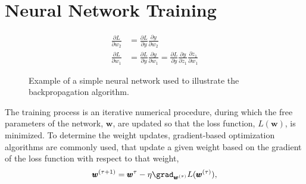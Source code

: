 \section{Neural Network Training}
\label{sec:nn-training}
\begin{figure}[t]
    \begin{align*}
        \frac{\partial L}{\partial w_2} &=  \frac{\partial L}{\partial y} \frac{\partial y}{\partial w_2} \\
        \frac{\partial L}{\partial w_1} &=  \frac{\partial L}{\partial y} \frac{\partial y}{\partial w_1} = \frac{\partial L}{\partial y} \frac{\partial y}{\partial z_1} \frac{\partial z_1}{\partial w_1}
    \end{align*}
    \caption{Example of a simple neural network used to illustrate the backpropagation algorithm.}
    \label{fig:simple-nn}
\end{figure}
The training process is an iterative numerical procedure, during which the free parameters of the network, $\pmb{w}$, are updated so that the loss function, $L(\pmb{w})$, is minimized. To determine the weight updates, gradient-based optimization algorithms are commonly used, that update a given weight based on the gradient of the loss function with respect to that weight, 
\begin{equation}
    \label{eq:gradient-descent}
    \pmb{w}^{(\tau+1)} = \pmb{w}^\tau - \eta \grad_{\pmb{w}^{(\tau)}} L(\pmb{w}^{(\tau)}),
\end{equation}
